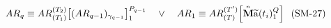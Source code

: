 \documentclass[preview]{standalone}
\begin{document}
\begin{align*}
\special{dvisvgm:raw <g id='unique000'>}AR_q \equiv AR_{(T_1)}^{(T_2)}\!\left[(AR_{q-1})_{\gamma_{q-1}}\right]_1^{P_{q-1}} \quad\lor\quad AR_1 \equiv AR_{(T)}^{(T')}\!\left[\overset{\scriptscriptstyle n}{\mathbf{M}}\widetilde{\mathrm{a}}(t_i)_1^Q\right]\;\;(\text{SM-27})\special{dvisvgm:raw </g>}
\end{align*}
\end{document}
